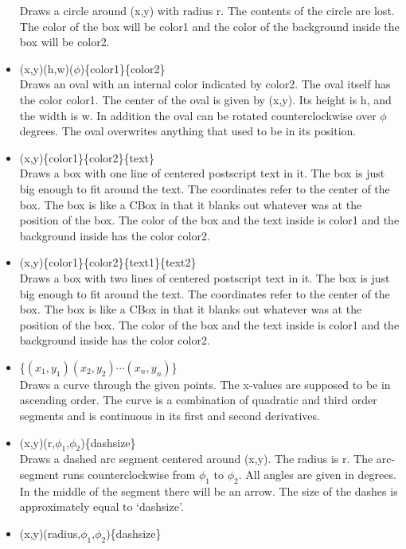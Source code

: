 \begin{itemize}
    Draws a circle around (x,y) with radius r. The contents of 
    the circle are lost. The color of the box will be color1 and the color 
    of the background inside the box will be color2.
\item {}(x,y)(h,w)($\phi$)\{color1\}\{color2\} \hfill \\
    Draws an oval with an internal color indicated by color2. The oval 
    itself has the color color1. The center of the oval 
    is given by (x,y). Its height is h, and the width is w. In addition 
    the oval can be rotated counterclockwise over $\phi$ degrees. The 
    oval overwrites anything that used to be in its position.
\item {}(x,y)\{color1\}\{color2\}\{text\} \hfill \\
    Draws a box with one line of centered postscript text in it. The 
    box is just big enough to fit around the text. The coordinates refer to 
    the center of the box. The box is like a CBox in that it blanks out 
    whatever was at the position of the box. The color of the box and the 
    text inside is color1 and the background inside has the color color2.
\item {}(x,y)\{color1\}\{color2\}\{text1\}\{text2\} \hfill \\
    Draws a box with two lines of centered postscript text in it. 
    The box is just big enough to fit around the text. The coordinates 
    refer to the center of the box. The box is like a CBox in that it blanks 
    out whatever was at the position of the box. The color of the box and the 
    text inside is color1 and the background inside has the color color2.
\item {}\{$(x_1,y_1)(x_2,y_2)\cdots(x_n,y_n)$\} \hfill \\
    Draws a curve through the given points. The x-values are supposed to 
    be in ascending order. The curve is a combination of quadratic and 
    third order segments and is continuous in its first and second derivatives.
\item {}(x,y)(r,$\phi_1$,$\phi_2$)\{dashsize\} \hfill \\
    Draws a dashed arc segment centered around (x,y). The radius is r. The 
    arc-segment runs counterclockwise from $\phi_1$ to $\phi_2$. All 
    angles are given in degrees. In the middle of the segment there will 
    be an arrow. The size of the dashes is approximately equal to 
    `dashsize'.
\item {}(x,y)(radius,$\phi_1$,$\phi_2$)\{dashsize\} \hfill \\

\end{itemize}
